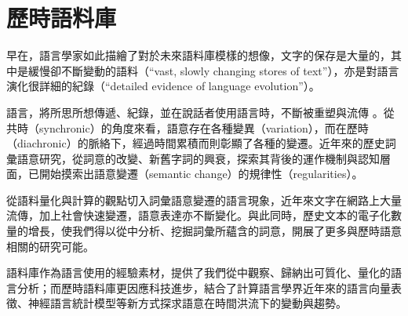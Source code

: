 

\chapter*{歷時語料庫}

早在\citeyear{sinclair1982reflections}，語言學家\citeauthor{sinclair1982reflections}如此描繪了對於未來語料庫模樣的想像，文字的保存是大量的，其中是緩慢卻不斷變動的語料（``vast, slowly changing stores of text''），亦是對語言演化很詳細的紀錄（``detailed evidence of language evolution''）。

語言，將所思所想傳遞、紀錄，並在說話者使用語言時，不斷被重塑與流傳 \parencite[61]{blank1999new}。從共時（synchronic）的角度來看，語意存在各種變異（variation），而在歷時（diachronic）的脈絡下，經過時間累積而則彰顯了各種的變遷。近年來的歷史詞彙語意研究，從詞意的改變、新舊字詞的興衰，探索其背後的運作機制與認知層面，已開始摸索出語意變遷（semantic change）的規律性（regularities）\parencite[63]{blank1999new}。

從語料量化與計算的觀點切入詞彙語意變遷的語言現象，近年來文字在網路上大量流傳，加上社會快速變遷，語意表達亦不斷變化。與此同時，歷史文本的電子化數量的增長，使我們得以從中分析、挖掘詞彙所蘊含的詞意，開展了更多與歷時語意相關的研究可能。

語料庫作為語言使用的經驗素材，提供了我們從中觀察、歸納出可質化、量化的語言分析；而歷時語料庫更因應科技進步，結合了計算語言學界近年來的語言向量表徵、神經語言統計模型等新方式探求語意在時間洪流下的變動與趨勢。

